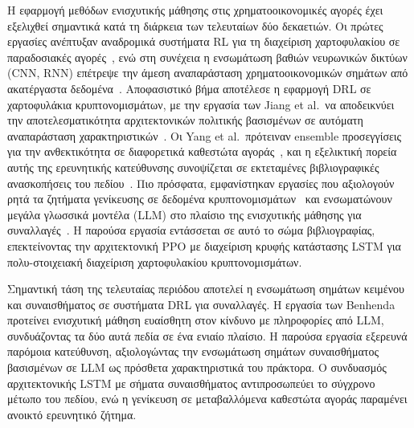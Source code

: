 Η εφαρμογή μεθόδων ενισχυτικής μάθησης στις χρηματοοικονομικές αγορές έχει
εξελιχθεί σημαντικά κατά τη διάρκεια των τελευταίων δύο δεκαετιών. Οι πρώτες
εργασίες ανέπτυξαν αναδρομικά συστήματα RL για τη διαχείριση χαρτοφυλακίου σε
παραδοσιακές αγορές~\cite{moody2001rltrading}, ενώ στη συνέχεια η ενσωμάτωση
βαθιών νευρωνικών δικτύων (CNN, RNN) επέτρεψε την άμεση αναπαράσταση
χρηματοοικονομικών σημάτων από ακατέργαστα δεδομένα~\cite{deng2016drltrading}.
Αποφασιστικό βήμα αποτέλεσε η εφαρμογή DRL σε χαρτοφυλάκια κρυπτονομισμάτων,
με την εργασία των Jiang et al.\ να αποδεικνύει την αποτελεσματικότητα αρχιτεκτονικών
πολιτικής βασισμένων σε αυτόματη αναπαράσταση χαρακτηριστικών~\cite{jiang2017cryptoportfolio}.
Οι Yang et al.\ πρότειναν ensemble προσεγγίσεις για την ανθεκτικότητα σε διαφορετικά
καθεστώτα αγοράς~\cite{yang2020ensemble}, και η εξελικτική πορεία αυτής της
ερευνητικής κατεύθυνσης συνοψίζεται σε εκτεταμένες βιβλιογραφικές ανασκοπήσεις
του πεδίου~\cite{hambly2023rlfinance}. Πιο πρόσφατα, εμφανίστηκαν εργασίες που
αξιολογούν ρητά τα ζητήματα γενίκευσης σε δεδομένα κρυπτονομισμάτων~\cite{gort2022finrlcrypto}
και ενσωματώνουν μεγάλα γλωσσικά μοντέλα (LLM) στο πλαίσιο της ενισχυτικής
μάθησης για συναλλαγές~\cite{benhenda2025finrldeepseek}. Η παρούσα εργασία
εντάσσεται σε αυτό το σώμα βιβλιογραφίας, επεκτείνοντας την αρχιτεκτονική
PPO με διαχείριση κρυφής κατάστασης LSTM για πολυ-στοιχειακή διαχείριση
χαρτοφυλακίου κρυπτονομισμάτων.

Σημαντική τάση της τελευταίας περιόδου αποτελεί η ενσωμάτωση σημάτων
κειμένου και συναισθήματος σε συστήματα DRL για συναλλαγές. Η εργασία
των Benhenda~\cite{benhenda2025finrldeepseek} προτείνει ενισχυτική μάθηση
ευαίσθητη στον κίνδυνο με πληροφορίες από LLM, συνδυάζοντας τα δύο
αυτά πεδία σε ένα ενιαίο πλαίσιο. Η παρούσα εργασία εξερευνά παρόμοια
κατεύθυνση, αξιολογώντας την ενσωμάτωση σημάτων συναισθήματος βασισμένων
σε LLM ως πρόσθετα χαρακτηριστικά του πράκτορα. Ο συνδυασμός αρχιτεκτονικής
LSTM με σήματα συναισθήματος αντιπροσωπεύει το σύγχρονο μέτωπο του πεδίου,
ενώ η γενίκευση σε μεταβαλλόμενα καθεστώτα αγοράς παραμένει ανοικτό
ερευνητικό ζήτημα.